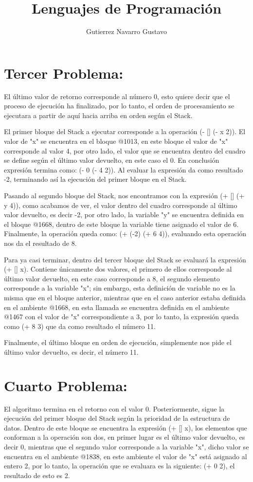 \documentclass{article}
\title{Lenguajes de Programación}
\author{Gutierrez Navarro Gustavo}
\begin{document}
\maketitle

\section{Tercer Problema:}
El último valor de retorno corresponde al número 0, esto quiere decir que el proceso de ejecución ha finalizado, 
por lo tanto, el orden de procesamiento se ejecutara a partir de aquí hacia arriba en orden según el Stack.
	
El primer bloque del Stack a ejecutar corresponde a la operación (- [] (- x 2)). El valor de "x" se encuentra en 
el bloque @1013, en este bloque el valor de "x" corresponde al valor 4, por otro lado, el valor que se encuentra 
dentro del cuadro se define según el último valor devuelto, en este caso el 0. En conclusión expresión termina 
como: (- 0 (- 4 2)). Al evaluar la expresión da como resultado -2, terminando así la ejecución del primer bloque 
en el Stack.
	
Pasando al segundo bloque del Stack, nos encontramos con la expresión (+ [] (+ y 4)), como acabamos de ver, el valor 
dentro del cuadro corresponde al último valor devuelto, es decir -2, por otro lado, la variable "y" se encuentra definida 
en el bloque @1668, dentro de este bloque la variable tiene asignado el valor de 6. Finalmente, la operación queda como: 
(+ (-2) (+ 6 4)), evaluando esta operación nos da el resultado de 8.
	
Para ya casi terminar, dentro del tercer bloque del Stack se evaluará la expresión (+ [] x). Contiene únicamente dos 
valores, el primero de ellos corresponde al último valor devuelto, en este caso corresponde a 8, el segundo elemento 
corresponde a la variable "x"; sin embargo, esta definición de variable no es la misma que en el bloque anterior, mientras 
que en el caso anterior estaba definida en el ambiente @1668, en esta llamada se encuentra definida en el ambiente @1467 
con el valor de "x" correspondiente a 3, por lo tanto, la expresión queda como (+ 8 3) que da como resultado el número 11.
	
Finalmente, el último bloque en orden de ejecución, simplemente nos pide el último valor devuelto, es decir, el número 11.
\section{Cuarto Problema:}
El algoritmo termina en el retorno con el valor 0. Posteriormente, sigue la ejecución del primer 
bloque del Stack según la prioridad de la estructura de datos. Dentro de este bloque se encuentra 
la expresión (+ [] x), los elementos que conforman a la operación son dos, en primer lugar es el 
último valor devuelto, es decir 0, mientras que el segundo valor corresponde a la variable "x", 
dicho valor se encuentra en el ambiente @1838, en este ambiente el valor de "x" está asignado al 
entero 2, por lo tanto, la operación que se evaluara es la siguiente: (+ 0 2), el resultado de
esto es 2.
	
\end{document}

